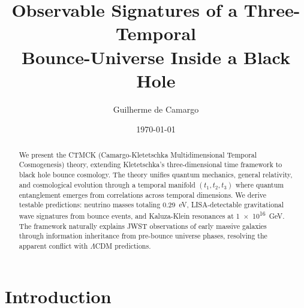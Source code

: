\documentclass[reprint,amsmath,amssymb,aps,prd,nofootinbib]{revtex4-2}
\begin{document}

\title{Observable Signatures of a Three-Temporal\\ Bounce-Universe Inside a Black Hole}

\author{Guilherme de Camargo}

\date{\today}

\begin{abstract}
We present the CTMCK (Camargo-Kletetschka Multidimensional Temporal Cosmogenesis) theory, extending Kletetschka's three-dimensional time framework to black hole bounce cosmology. The theory unifies quantum mechanics, general relativity, and cosmological evolution through a temporal manifold $(t_1,t_2,t_3)$ where quantum entanglement emerges from correlations across temporal dimensions. We derive testable predictions: neutrino masses totaling \SI{0.29}{\electronvolt}, LISA-detectable gravitational wave signatures from bounce events, and Kaluza-Klein resonances at \SI{1e16}{\giga\electronvolt}. The framework naturally explains JWST observations of early massive galaxies through information inheritance from pre-bounce universe phases, resolving the apparent conflict with $\Lambda$CDM predictions.
\end{abstract}

\maketitle


\section{Introduction}\label{sec:intro}
\end{document}
